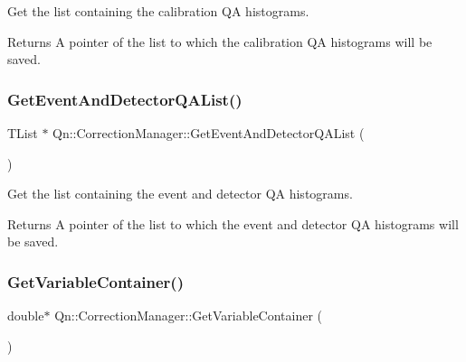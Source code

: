 Get the list containing the calibration QA histograms. 

\begin{DoxyReturn}{Returns}
A pointer of the list to which the calibration QA histograms will be saved. 
\end{DoxyReturn}
\mbox{\label{classQn_1_1CorrectionManager_a2a1f13026f434d2280bee0f191172a09}} 
\subsubsection{\texorpdfstring{Get\+Event\+And\+Detector\+Q\+A\+List()}{GetEventAndDetectorQAList()}}
{\footnotesize\ttfamily T\+List $\ast$ Qn\+::\+Correction\+Manager\+::\+Get\+Event\+And\+Detector\+Q\+A\+List (\begin{DoxyParamCaption}{ }\end{DoxyParamCaption})}



Get the list containing the event and detector QA histograms. 

\begin{DoxyReturn}{Returns}
A pointer of the list to which the event and detector QA histograms will be saved. 
\end{DoxyReturn}
\mbox{\label{classQn_1_1CorrectionManager_a2883b579d2c4afbccee27add9101e84a}} 
\subsubsection{\texorpdfstring{Get\+Variable\+Container()}{GetVariableContainer()}}
{\footnotesize\ttfamily double$\ast$ Qn\+::\+Correction\+Manager\+::\+Get\+Variable\+Container (\begin{DoxyParamCaption}{ }\end{DoxyParamCaption})\hspace{0.3cm}{\ttfamily [inline]}}




